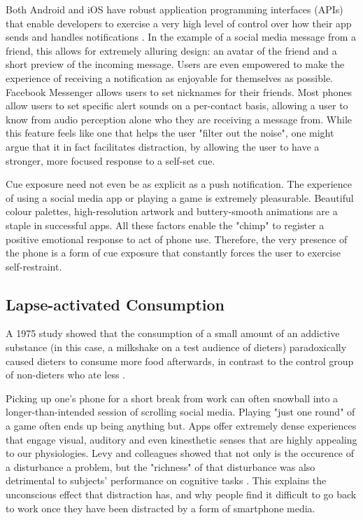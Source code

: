 Both Android and iOS have robust application programming interfaces (APIs) that enable developers to exercise a very high level of control over how their app sends and handles notifications \cite{androidnotification}. In the example of a social media message from a friend, this allows for extremely alluring design: an avatar of the friend and a short preview of the incoming message. Users are even empowered to make the experience of receiving a notification as enjoyable for themselves as possible. Facebook Messenger allows users to set nicknames for their friends. Most phones allow users to set specific alert sounds on a per-contact basis, allowing a user to know from audio perception alone who they are receiving a message from. While this feature feels like one that helps the user "filter out the noise", one might argue that it in fact facilitates distraction, by allowing the user to have a stronger, more focused response to a self-set cue.

Cue exposure need not even be as explicit as a push notification. The experience of using a social media app or playing a game is extremely pleasurable. Beautiful colour palettes, high-resolution artwork and buttery-smooth animations are a staple in successful apps. All these factors enable the "chimp" to register a positive emotional response to act of phone use. Therefore, the very presence of the phone is a form of cue exposure that constantly forces the user to exercise self-restraint.

\subsection{Lapse-activated Consumption}
A 1975 study showed that the consumption of a small amount of an addictive substance (in this case, a milkshake on a test audience of dieters) paradoxically caused dieters to consume more food afterwards, in contrast to the control group of non-dieters who ate less \cite{herman1975restrained}.

Picking up one's phone for a short break from work can often snowball into a longer-than-intended session of scrolling social media. Playing "just one round" of a game often ends up being anything but. Apps offer extremely dense experiences that engage visual, auditory and even kinesthetic senses that are highly appealing to our physiologies. Levy and colleagues showed that not only is the occurence of a disturbance a problem, but the "richness" of that disturbance was also detrimental to subjects' performance on cognitive tasks \cite{levy2016effect}. This explains the unconscious effect that distraction has, and why people find it difficult to go back to work once they have been distracted by a form of smartphone media.

